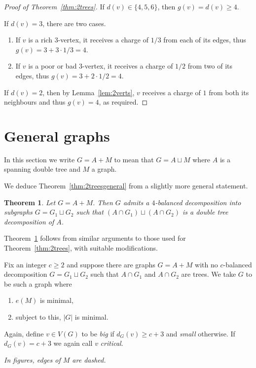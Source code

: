 \documentclass[11pt, reqno, a4paper]{article}
\newtheorem{theorem}{Theorem}
\theoremstyle{definition}
\numberwithin{equation}{section}
\renewcommand{\geq}{\geqslant}
\begin{document}
\begin{proof}[Proof of Theorem~\ref{thm:2trees}]
If $d(v) \in \{4,5,6\}$, then $g(v) = d(v) \geq 4$.

If $d(v) =3$, there are two cases.
\begin{enumerate}[noitemsep]
\item If $v$ is a rich $3$-vertex, it receives a charge of $1/3$ from each of its edges, thus $g(v) = 3+ 3\cdot 1/3 = 4$.
\item If $v$ is a poor or bad $3$-vertex, it receives a charge of $1/2$ from two of its edges, thus $g(v) = 3 + 2 \cdot 1/2 = 4$.
\end{enumerate}
If $d(v) = 2$, then by Lemma~\ref{lem:2verts}, $v$ receives a charge of $1$ from both its neighbours and thus $g(v) = 4$, as required.
\end{proof}

\section{General graphs}\label{sec:general}
In this section we write $G= A+M$ to mean that $G = A\sqcup M$ where $A$ is a spanning double tree and $M$ a graph.

We deduce Theorem~\ref{thm:2treesgeneral} from a slightly more general statement.
\begin{theorem}\label{claim:general}
Let $G = A + M$. 
Then $G$ admits a $4$-balanced decomposition into subgraphs $G=G_1\sqcup G_2$ such that
$(A\cap G_1) \sqcup (A \cap G_2)$ is a double tree decomposition of $A$.
\end{theorem} 
Theorem~\ref{claim:general} follows from similar arguments to those used for Theorem~\ref{thm:2trees}, with suitable modifications.

Fix an integer $c\geq 2$ and suppose there are graphs $G = A + M$ with no \(c\)-balanced decomposition $G=G_1\sqcup G_2$ such that
$A\cap G_1$ and $A \cap G_2$ are trees. We take \(G\) to be such a graph where
\begin{enumerate}[noitemsep]
\item $e(M)$ is minimal,
\item subject to this, $|G|$ is minimal.
\end{enumerate}
Again, define $v\in V(G)$ to be \emph{big} if $d_G(v) \geq c+3$ and \emph{small} otherwise. 
If $d_G(v) = c+3$ we again call $v$ \emph{critical}.

\textit{In figures, edges of $M$ are dashed.}
\end{document}
